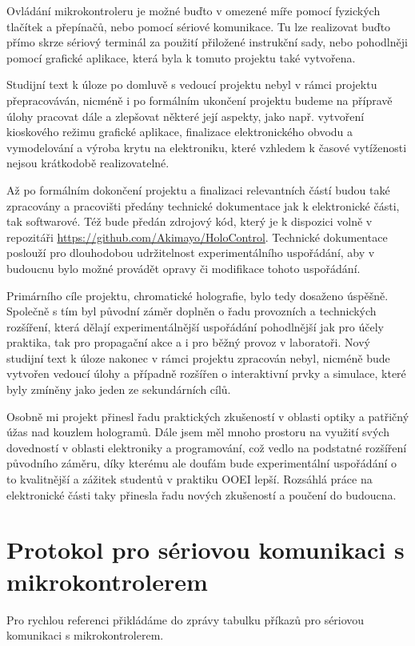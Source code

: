 \documentclass[twoside,project]{../MFFPrace}
\begin{document}
Ovládání mikrokontroleru je možné buďto v omezené míře pomocí fyzických tlačítek a přepínačů, nebo pomocí sériové komunikace. Tu lze realizovat buďto přímo skrze sériový terminál za použití přiložené instrukční sady, nebo pohodlněji pomocí grafické aplikace, která byla k tomuto projektu také vytvořena.

\medskip

Studijní text k úloze po domluvě s vedoucí projektu nebyl v rámci projektu přepracováván, nicméně i po formálním ukončení projektu budeme na přípravě úlohy pracovat dále a zlepšovat některé její aspekty, jako např. vytvoření kioskového režimu grafické aplikace, finalizace elektronického obvodu a vymodelování a výroba krytu na elektroniku, které vzhledem k časové vytíženosti nejsou krátkodobě realizovatelné.

Až po formálním dokončení projektu a finalizaci relevantních částí budou také zpracovány a pracovišti předány technické dokumentace jak k elektronické části, tak softwarové. Též bude předán zdrojový kód, který je k dispozici volně v repozitáři \url{https://github.com/Akimayo/HoloControl}. Technické dokumentace poslouží pro dlouhodobou udržitelnost experimentálního uspořádání, aby v budoucnu bylo možné provádět opravy či modifikace tohoto uspořádání.

\medskip

Primárního cíle projektu, chromatické holografie, bylo tedy dosaženo úspěšně. Společně s tím byl původní záměr doplněn o řadu provozních a technických rozšíření, která dělají experimentálnější uspořádání pohodlnější jak pro účely praktika, tak pro propagační akce a i pro běžný provoz v laboratoři. Nový studijní text k úloze nakonec v rámci projektu zpracován nebyl, nicméně bude vytvořen vedoucí úlohy a případně rozšířen o interaktivní prvky a simulace, které byly zmíněny jako jeden ze sekundárních cílů.

\medskip

Osobně mi projekt přinesl řadu praktických zkušeností v oblasti optiky a patřičný úžas nad kouzlem hologramů. Dále jsem měl mnoho prostoru na využití svých dovedností v oblasti elektroniky a programování, což vedlo na podstatné rozšíření původního záměru, díky kterému ale doufám bude experimentální uspořádání o to kvalitnější a zážitek studentů v praktiku OOEI lepší. Rozsáhlá práce na elektronické části taky přinesla řadu nových zkušeností a poučení do budoucna.

\printbibliography[title=Reference]

\appendix
\chapter{Protokol pro sériovou komunikaci s mikrokontrolerem\label{cpt:appendix}}
Pro rychlou referenci přikládáme do zprávy tabulku příkazů pro sériovou komunikaci s mikrokontrolerem.
\end{document}
